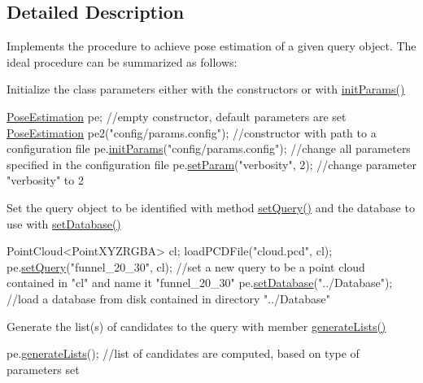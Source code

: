 \subsection{Detailed Description}
Implements the procedure to achieve pose estimation of a given query object. The ideal procedure can be summarized as follows\-: 


\begin{DoxyItemize}
\item Initialize the class parameters either with the constructors or with \hyperlink{classPoseEstimation_a8359f6ffae7fc0cf99692d926dd1e7c4}{init\-Params()} 
\begin{DoxyCode}
\hyperlink{classPoseEstimation}{PoseEstimation} pe; \textcolor{comment}{//empty constructor, default parameters are set}
\hyperlink{classPoseEstimation}{PoseEstimation} pe2(\textcolor{stringliteral}{"config/params.config"}); \textcolor{comment}{//constructor with path to a configuration file}
pe.\hyperlink{classPoseEstimation_a8359f6ffae7fc0cf99692d926dd1e7c4}{initParams}(\textcolor{stringliteral}{"config/params.config"}); \textcolor{comment}{//change all parameters specified in the configuration
       file}
pe.\hyperlink{classPoseEstimation_ae416bbbfdefdb60a6f82a9b255edc124}{setParam}(\textcolor{stringliteral}{"verbosity"}, 2); \textcolor{comment}{//change parameter "verbosity" to 2}
\end{DoxyCode}

\item Set the query object to be identified with method \hyperlink{classPoseEstimation_a8c3e730167d42d2d8cfd4a08389d17ce}{set\-Query()} and the database to use with \hyperlink{classPoseEstimation_a0ace84f98f2bab31e64ffaa4eefdf402}{set\-Database()} 
\begin{DoxyCode}
PointCloud<PointXYZRGBA> cl;
loadPCDFile(\textcolor{stringliteral}{"cloud.pcd"}, cl);
pe.\hyperlink{classPoseEstimation_a8c3e730167d42d2d8cfd4a08389d17ce}{setQuery}(\textcolor{stringliteral}{"funnel\_20\_30"}, cl); \textcolor{comment}{//set a new query to be a point cloud contained in "cl" and name
       it "funnel\_20\_30"}
pe.\hyperlink{classPoseEstimation_a0ace84f98f2bab31e64ffaa4eefdf402}{setDatabase}(\textcolor{stringliteral}{"../Database"}); \textcolor{comment}{//load a database from disk contained in directory "../Database"}
\end{DoxyCode}

\item Generate the list(s) of candidates to the query with member \hyperlink{classPoseEstimation_aa240b7ff2e362aa091f531ebd34359ad}{generate\-Lists()} 
\begin{DoxyCode}
pe.\hyperlink{classPoseEstimation_a7f16094de53753e91efa3d4728a928be}{generateLists}(); \textcolor{comment}{//list of candidates are computed, based on type of parameters set}
\end{DoxyCode}


\end{DoxyItemize}
